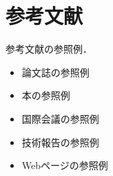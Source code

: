 \section{参考文献}
参考文献の参照例．
\begin{itemize}
\item 論文誌の参照例 \cite{Article_01}
\item 本の参照例 \cite{Book_02}
\item 国際会議の参照例 \cite{Inproc_03}
\item 技術報告の参照例 \cite{Techrep_05}
\item Webページの参照例 \cite{Web_06}
\end{itemize}
